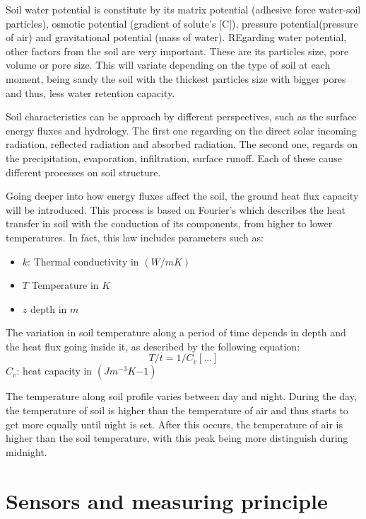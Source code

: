 \documentclass[
]{article}
\providecommand{\tightlist}{%
  \setlength{\itemsep}{0pt}\setlength{\parskip}{0pt}}
\begin{document}
Soil water potential is constitute by its matrix potential (adhesive force water-soil particles), osmotic potential (gradient of solute's {[}C{]}), pressure potential(pressure of air) and gravitational potential (mass of water).
REgarding water potential, other factors from the soil are very important.
These are its particles size, pore volume or pore size. This will variate depending on the type of soil at each moment, being sandy the soil with the thickest particles size with bigger pores and thus, less water retention capacity.

Soil characteristics can be approach by different perspectives, such as the surface energy fluxes and hydrology.
The first one regarding on the direct solar incoming radiation, reflected radiation and absorbed radiation.
The second one, regards on the precipitation, evaporation, infiltration, surface runoff. Each of these cause different processes on soil structure.

Going deeper into how energy fluxes affect the soil, the ground heat flux capacity will be introduced.
This process is based on Fourier's which describes the heat transfer in soil with the conduction of its components, from higher to lower temperatures.
In fact, this law includes parameters such as:

\begin{itemize}
\tightlist
\item
  \(k\): Thermal conductivity in \((W/mK)\)
\item
  \(T\) Temperature in \(K\)
\item
  \(z\) depth in \(m\)
\end{itemize}

The variation in soil temperature along a period of time depends in depth and the heat flux going inside it, as described by the following equation:
\[ T/t = 1/C_v [...]\]
\(C_v\): heat capacity in \((J m^{-3}K{-1})\)

The temperature along soil profile varies between day and night. During the day, the temperature of soil is higher than the temperature of air and thus starts to get more equally until night is set. After this occurs, the temperature of air is higher than the soil temperature, with this peak being more distinguish during midnight.

\hypertarget{sensors-and-measuring-principle}{%
\section{Sensors and measuring principle}\label{sensors-and-measuring-principle}}
\end{document}
